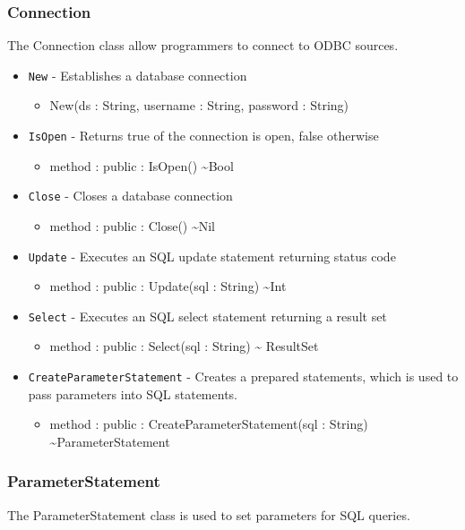\documentclass[11pt]{article}
\begin{document}
\subsubsection{Connection}
The Connection class allow programmers to connect to ODBC sources.

\begin{itemize}
\item \texttt{New} - Establishes a database connection
  \begin{itemize}
  \item New(ds : String, username : String, password : String)
  \end{itemize}
\item \texttt{IsOpen} - Returns true of the connection is open, false otherwise
  \begin{itemize}
  \item method : public : IsOpen() \textasciitilde Bool
  \end{itemize}
\item \texttt{Close} - Closes a database connection
  \begin{itemize}
  \item method : public : Close() \textasciitilde Nil
  \end{itemize}
\item \texttt{Update} - Executes an SQL update statement returning
  status code
  \begin{itemize}
  \item method : public : Update(sql : String) \textasciitilde Int
  \end{itemize}
\item \texttt{Select} - Executes an SQL select statement returning a
  result set
  \begin{itemize}
  \item method : public : Select(sql : String) \textasciitilde
    ResultSet
  \end{itemize}
\item \texttt{CreateParameterStatement} - Creates a prepared
  statements, which is used to pass parameters into SQL statements.
  \begin{itemize}
  \item method : public : CreateParameterStatement(sql : String)
    \textasciitilde ParameterStatement
  \end{itemize}
\end{itemize}

\subsubsection{ParameterStatement}
The ParameterStatement class is used to set parameters for SQL
queries.
\end{document}
